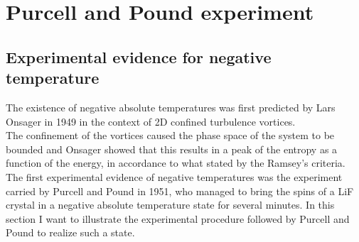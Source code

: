 \chapter{Purcell and Pound experiment}
\label{ch:PandP}
\section{Experimental evidence for negative temperature}
The existence of negative absolute temperatures was first predicted by Lars Onsager in 1949 \cite{Onsager} in the context of 2D confined turbulence vortices. \\
The confinement of the vortices caused the phase space of the system to be bounded and Onsager showed that this results in a peak of the entropy as a function of the energy, in accordance
to what stated by the Ramsey's criteria. \\
The first experimental evidence of negative temperatures was the experiment carried by Purcell and Pound \cite{PandP} in 1951, who managed to bring the spins of a LiF crystal in a negative absolute temperature
state for several minutes.
In this section I want to illustrate the experimental procedure followed by Purcell and Pound to realize such a state.\\
